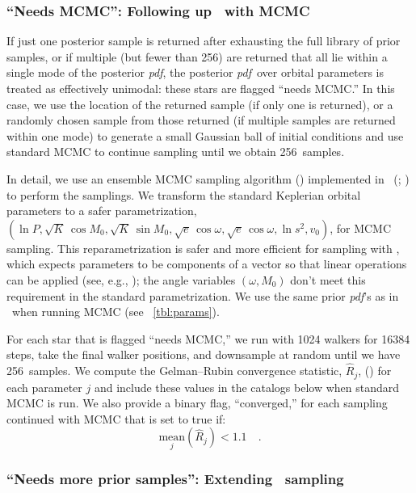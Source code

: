 \documentclass[modern, letterpaper]{aastex62}
\newcommand{\thejoker}{\project{The~Joker}}
\newcommand{\pdf}{\textit{pdf}}
\newcommand{\nposterior}{256}
\begin{document}
\subsubsection{``Needs MCMC'': Following up \thejoker\ with MCMC}
\label{sec:mcmc}

If just one posterior sample is returned after exhausting the full library of
prior samples, or if multiple (but fewer than \nposterior) are returned that all
lie within a single mode of the posterior \pdf, the posterior \pdf\ over orbital
parameters is treated as effectively unimodal: these stars are flagged ``needs
MCMC.''
In this case, we use the location of the returned sample (if only one is
returned), or a randomly chosen sample from those returned (if multiple samples
are returned within one mode) to generate a small Gaussian ball of initial
conditions and use standard MCMC to continue sampling until we obtain
\nposterior\ samples.

In detail, we use an ensemble MCMC sampling algorithm (\citealt{Goodman:2010})
implemented in \python\ (; \citealt{Foreman-Mackey:2013}) to
perform the samplings.
We transform the standard Keplerian orbital parameters to a safer
parametrization, $(\ln P, \sqrt{K}\,\cos M_0, \sqrt{K}\,\sin M_0, \sqrt{e}\,\cos
\omega, \sqrt{e}\,\cos \omega, \ln s^2, v_0)$, for MCMC sampling.
This reparametrization is safer and more efficient for sampling with
, which expects parameters to be components of a vector so that
linear operations can be applied (see, e.g., \citealt{Hogg:2017}); the angle
variables $(\omega, M_0)$ don't meet this requirement in the standard
parametrization.
We use the same prior \pdf 's as in \thejoker\ when running MCMC (see
\tablename~\ref{tbl:params}).

For each star that is flagged ``needs MCMC,'' we run  with 1024
walkers for 16384 steps, take the final walker positions, and downsample at
random until we have \nposterior\ samples.
We compute the Gelman--Rubin convergence statistic, $\hat{R}_j$,
(\citealt{Gelman:1992}) for each parameter $j$ and include these values in the
catalogs below when standard MCMC is run.
We also provide a binary flag, ``converged,'' for each sampling continued with
MCMC that is set to true if:
\begin{equation}
\underset{j}{\textrm{mean}}\left(\hat{R}_j\right) < 1.1 \quad .
\end{equation}


\subsubsection{``Needs more prior samples'': Extending \thejoker\ sampling}
\end{document}
